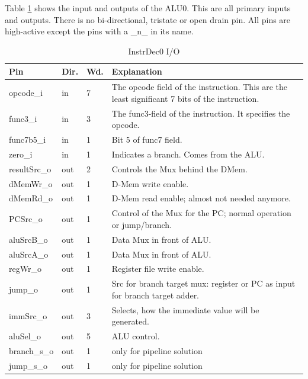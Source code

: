 Table \ref{tab:asDec01} shows the input and outputs of the ALU0. This are all primary inputs and outputs. There is no bi-directional, tristate or open drain pin. All pins are high-active except the pins with a \_n\_ in its name.
\begin{table}[H]
\caption{InstrDec0 I/O}
\label{tab:asDec01}
\centering
\begin{tabularx}{\textwidth}{|l |l |l |X|}
  \hline
  Pin & Dir. & Wd. & Explanation \\
  \hline
  \hline
  opcode\_i & in & 7 & The opcode field of the instruction. This are the least significant 7 bits of the instruction. \\
  \hline
  func3\_i & in & 3 & The func3-field of the instruction. It specifies the opcode. \\
  \hline
  func7b5\_i & in & 1 &  Bit 5 of func7 field. \\
  \hline
  zero\_i & in & 1 &  Indicates a branch. Comes from the ALU. \\
  \hline
  resultSrc\_o & out & 2 & Controls the Mux behind the DMem. \\
  \hline
  dMemWr\_o & out & 1 &  D-Mem write enable. \\
  \hline
  dMemRd\_o & out & 1 &  D-Mem read enable; almost not needed anymore. \\
  \hline
  PCSrc\_o & out & 1 &  Control of the Mux for the PC; normal operation or jump/branch. \\
  \hline
  aluSrcB\_o & out & 1 &  Data Mux in front of ALU. \\
  \hline
  aluSrcA\_o & out & 1 &  Data Mux in front of ALU. \\
  \hline
  regWr\_o & out & 1 &  Register file write enable. \\
  \hline
  jump\_o & out & 1 &   Src for branch target mux: register or PC as input for branch target adder. \\
  \hline
  immSrc\_o & out & 3 &   Selects, how the immediate value will be generated. \\
  \hline
  aluSel\_o & out & 5 &  ALU control. \\
  \hline
  branch\_s\_o & out & 1 &  only for pipeline solution \\
  \hline
  jump\_s\_o & out & 1 &  only for pipeline solution \\
  \hline
\end{tabularx}
\end{table}
